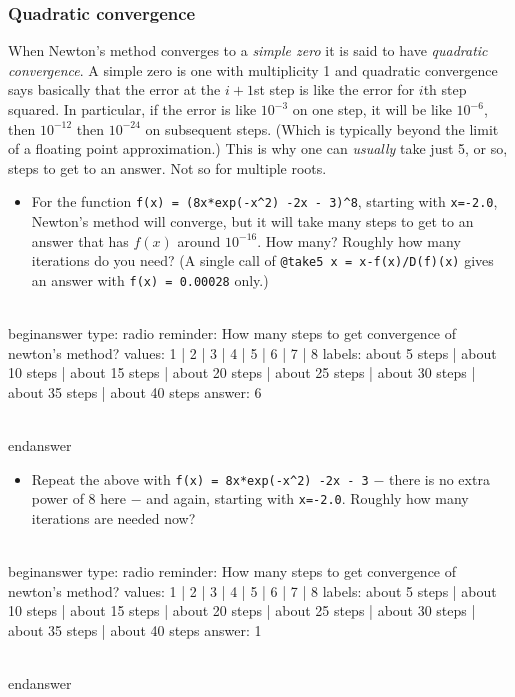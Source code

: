 \documentclass[12pt]{article}
\begin{document}
\subsubsection{Quadratic convergence}\newline
When Newton's method converges to a \textit{simple zero} it is said to have \textit{quadratic convergence}. A simple zero is one with multiplicity 1 and quadratic convergence says basically that the error at the $i+1$st step is like the error for $i$th step squared. In particular, if the error is like $10^{-3}$ on one step, it will be like $10^{-6}$, then $10^{-12}$ then $10^{-24}$ on subsequent steps. (Which is typically beyond the limit of a floating point approximation.) This is why one can \textit{usually} take just 5, or so, steps to get to an answer.\newline
Not so for multiple roots. \begin{itemize}\item For the function \texttt{f(x) = (8x*exp(-x^2) -2x - 3)^8}, starting with   \texttt{x=-2.0}, Newton's method will converge, but it will take many steps   to get to an answer that has $f(x)$ around $10^{-16}$. How many?   Roughly how many iterations do you need? (A single call of    \texttt{@take5 x = x-f(x)/D(f)(x)} gives an answer with \texttt{f(x) = 0.00028} only.)\end{itemize}
\\begin{answer}
type: radio
reminder: How many steps to get convergence of newton's method?
values: 1 | 2 | 3 | 4 | 5 | 6 | 7 | 8
labels: about 5 steps | about 10 steps | about 15 steps | about 20 steps | about 25 steps | about 30 steps | about 35 steps | about 40 steps
answer: 6

\\end{answer}
\begin{itemize}\item Repeat the above with \texttt{f(x) = 8x*exp(-x^2) -2x - 3} $-$ there is no   extra power of $8$ here $-$ and again, starting with   \texttt{x=-2.0}. Roughly how many iterations are needed now?\end{itemize}
\\begin{answer}
type: radio
reminder: How many steps to get convergence of newton's method?
values: 1 | 2 | 3 | 4 | 5 | 6 | 7 | 8
labels: about 5 steps | about 10 steps | about 15 steps | about 20 steps | about 25 steps | about 30 steps | about 35 steps | about 40 steps
answer: 1

\\end{answer}
\end{document}
